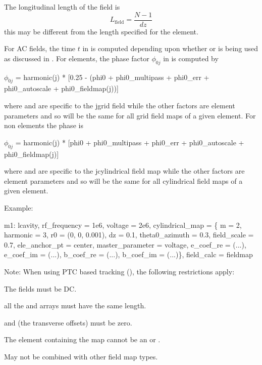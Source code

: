 The longitudinal length of the field is
\begin{equation}
  L_{\text{field}} = \frac{N - 1}{dz}
\end{equation}
this may be different from the length  specified for the element.

For AC fields, the time $t$ in  is computed depending upon whether  or  is being used as discussed in . For
 elements, the phase factor $\phi_{0j}$ in  is computed by
\begin{example}
  \(\phi_{0j}\) = harmonic(j) * [0.25 - (phi0 + phi0_multipass + phi0_err + 
                                                  phi0_autoscale + phi0_fieldmap(j))] 
\end{example}
where  and  are specific to the j\Th grid field
while the other factors are element parameters and so will be the same for all grid field
maps of a given element. For non  elements the phase is
\begin{example}
  \(\phi_{0j}\) = harmonic(j) * [phi0 + phi0_multipass + phi0_err + 
                                                  phi0_autoscale + phi0_fieldmap(j)]
\end{example}
where  and  are specific to the j\Th cylindrical field map
while the other factors are element parameters and so will be the same for all cylindrical field
maps of a given element.

Example:
\begin{example}
  m1: lcavity, rf_frequency = 1e6, voltage = 2e6, cylindrical_map = \{
    m = 2,                   harmonic = 3,
    r0 = (0, 0, 0.001),      dz = 0.1,
    theta0_azimuth = 0.3,    field_scale = 0.7,
    ele_anchor_pt = center,  master_parameter = voltage,
    e_coef_re = (...),       e_coef_im = (...),
    b_coef_re = (...),       b_coef_im = (...)\}, field_calc = fieldmap
\end{example}

Note: When using PTC based tracking (), the following restrictions apply:
\begin{Itemize}
\item
The fields must be DC.
\item
all the  and  arrays must have the same length.
\item
{} and  (the transverse offsets) must be zero.
\item
The element containing the map cannot be an  or .
\item
May not be combined with other field map types.
\end{Itemize}

